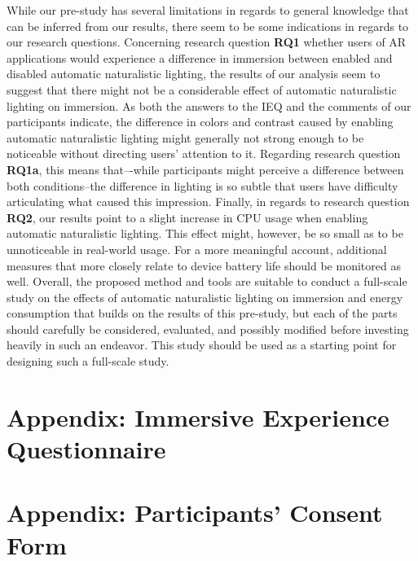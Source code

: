 \documentclass[12pt,twoside,english]{article}
\begin{document}
While our pre-study has several limitations in regards to general knowledge that can be inferred from our results, there seem to be some indications in regards to our research questions.
Concerning research question \textbf{RQ1} whether users of \gls{AR} applications would experience a difference in immersion between enabled and disabled automatic naturalistic lighting, the results of our analysis seem to suggest that there might not be a considerable effect of automatic naturalistic lighting on immersion.
As both the answers to the \gls{IEQ} and the comments of our participants indicate, the difference in colors and contrast caused by enabling automatic naturalistic lighting might generally not strong enough to be noticeable without directing users' attention to it.
Regarding research question \textbf{RQ1a}, this means that–-while participants might perceive a difference between both conditions--the difference in lighting is so subtle that users have difficulty articulating what caused this impression.
Finally, in regards to research question \textbf{RQ2}, our results point to a slight increase in \gls{CPU} usage when enabling automatic naturalistic lighting.
This effect might, however, be so small as to be unnoticeable in real-world usage.
For a more meaningful account, additional measures that more closely relate to device battery life should be monitored as well.
Overall, the proposed method and tools are suitable to conduct a full-scale study on the effects of automatic naturalistic lighting on immersion and energy consumption that builds on the results of this pre-study, but each of the parts should carefully be considered, evaluated, and possibly modified before investing heavily in such an endeavor.
This study should be used as a starting point for designing such a full-scale study.



% 


\appendix
\section{Appendix: Immersive Experience Questionnaire}
\label{sect:appendix}
\label{sect:ieq}

\section{Appendix: Participants' Consent Form}
\label{sect:consent-form}

\clearpage
\end{document}
